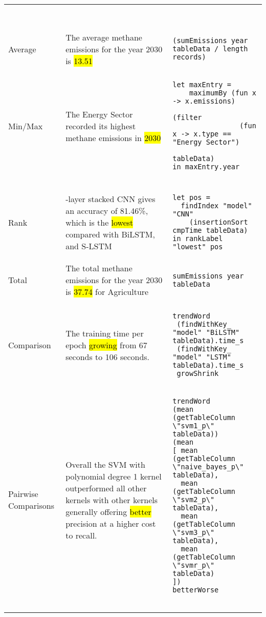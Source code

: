 \begin{table}[!ht]
\begin{tabular}{>{\raggedright\arraybackslash}p{2cm} >{\raggedright\arraybackslash}p{5cm} >{\raggedright\arraybackslash}p{6cm}}
\begin{lstlisting}[language=Fluid,numbers=none]
        \end{lstlisting}  \\
        \rowcolor{gray!20}
        \multicolumn{3}{>{\raggedright\arraybackslash}l}{\textbf{Aggregation}} \\
        Average
        & The average methane emissions for the year 2030 is \hl{13.51} &
        \begin{lstlisting}[language=Fluid,numbers=none]
(sumEmissions year tableData / length records)
        \end{lstlisting} \\
        Min/Max                          & The Energy Sector recorded its highest methane emissions in \hl{2030}             &
        \begin{lstlisting}[language=Fluid,numbers=none]
let maxEntry =
    maximumBy (fun x -> x.emissions)
              (filter
                (fun x -> x.type == "Energy Sector")
                tableData)
in maxEntry.year
        \end{lstlisting} \\                             \\
        Rank &
        3-layer stacked CNN gives an accuracy of 81.46\%, which is the \hl{lowest} compared with BiLSTM, and S-LSTM  &
        \begin{lstlisting}[language=Fluid,numbers=none]
let pos =
  findIndex "model" "CNN"
    (insertionSort cmpTime tableData)
in rankLabel "lowest" pos \end{lstlisting} \\
        Total &
        The total methane emissions for the year 2030 is \hl{37.74} for Agriculture &
        \begin{lstlisting}[language=Fluid,numbers=none]
sumEmissions year tableData
        \end{lstlisting} \\
        \rowcolor{gray!20}
        \multicolumn{3}{>{\raggedright\arraybackslash}l}{\textbf{Trends}} \\

        Comparison
        & The training time per epoch \hl{growing} from 67 seconds to 106 seconds. &
        \begin{lstlisting}[language=Fluid,numbers=none]
trendWord
 (findWithKey_ "model" "BiLSTM" tableData).time_s
 (findWithKey_ "model" "LSTM" tableData).time_s
 growShrink
        \end{lstlisting} \\
        Pairwise Comparisons
        & Overall the SVM with polynomial degree 1 kernel outperformed all other kernels with other kernels generally offering \hl{better} precision at a higher cost to recall. &
        \begin{lstlisting}[language=Fluid,numbers=none]
trendWord
(mean (getTableColumn \"svm1_p\" tableData))
(mean
[ mean (getTableColumn \"naive_bayes_p\" tableData),
  mean (getTableColumn \"svm2_p\" tableData),
  mean (getTableColumn \"svm3_p\" tableData),
  mean (getTableColumn \"svmr_p\" tableData)
])
betterWorse


\end{lstlisting}
\end{tabular}
\end{table}
